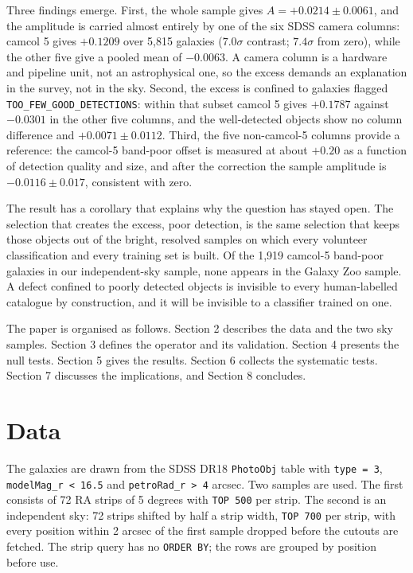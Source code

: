 \documentclass[11pt]{article}
\newcommand{\toofew}{\texttt{TOO\_\allowbreak FEW\_\allowbreak GOOD\_\allowbreak DETECTIONS}}
\begin{document}
Three findings emerge. First, the whole sample gives $A = +0.0214 \pm 0.0061$, and the amplitude is
carried almost entirely by one of the six SDSS camera columns: camcol 5 gives $+0.1209$ over 5,815
galaxies ($7.0\sigma$ contrast; $7.4\sigma$ from zero), while the other five give a
pooled mean of $-0.0063$. A camera column is a hardware and pipeline unit, not an astrophysical
one, so the excess demands an explanation in the survey, not in the sky. Second, the excess is
confined to galaxies flagged \toofew: within that subset camcol 5 gives
$+0.1787$ against $-0.0301$ in the other five columns, and the well-detected objects show no
column difference and $+0.0071 \pm 0.0112$. Third, the five non-camcol-5 columns provide a reference:
the camcol-5 band-poor offset is measured at about $+0.20$ as a function of detection quality and
size, and after the correction the sample amplitude is $-0.0116 \pm 0.017$, consistent with zero.

The result has a corollary that explains why the question has stayed open. The selection that
creates the excess, poor detection, is the same selection that keeps those objects out of the
bright, resolved samples on which every volunteer classification and every training set is built.
Of the 1,919 camcol-5 band-poor galaxies in our independent-sky sample, none appears in the Galaxy
Zoo sample. A defect confined to poorly detected objects is invisible to every human-labelled
catalogue by construction, and it will be invisible to a classifier trained on one.

The paper is organised as follows. Section 2 describes the data and the two sky samples. Section 3
defines the operator and its validation. Section 4 presents the null tests. Section 5 gives the
results. Section 6 collects the systematic tests. Section 7 discusses the implications, and
Section 8 concludes.

\section{Data}

The galaxies are drawn from the SDSS DR18 \texttt{PhotoObj} table with \texttt{type = 3},
\texttt{modelMag\_r < 16.5} and \texttt{petroRad\_r > 4} arcsec. Two samples are used. The first
consists of 72 RA strips of 5 degrees with \texttt{TOP 500} per strip. The second is an independent
sky: 72 strips shifted by half a strip width, \texttt{TOP 700} per strip, with every position
within 2 arcsec of the first sample dropped before the cutouts are fetched. The strip query has no
\texttt{ORDER BY}; the rows are grouped by position before use.
\end{document}
